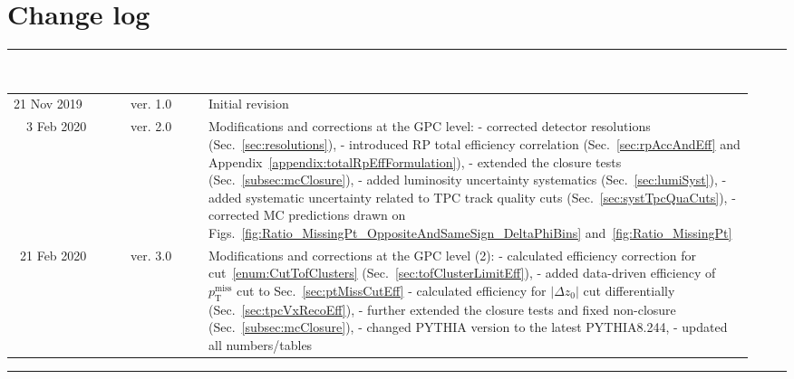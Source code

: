 \section*{\LARGE Change log}%
%
  \rule{\textwidth}{1.0pt}\\[5pt]%
  \begin{tabular}{>{\raggedright}p{0.15\linewidth}p{0.1\linewidth}p{0.7\linewidth}}
  	21 Nov 2019 & ver. 1.0 & Initial revision\\
  	~~3 Feb 2020 & ver. 2.0 & Modifications and corrections at the GPC level:%
  	\newline- corrected detector resolutions (Sec.~\ref{sec:resolutions}),%
  	\newline- introduced RP total efficiency correlation (Sec.~\ref{sec:rpAccAndEff} and Appendix~\ref{appendix:totalRpEffFormulation}),%
  	\newline- extended the closure tests (Sec.~\ref{subsec:mcClosure}),%
  	\newline- added luminosity uncertainty systematics (Sec.~\ref{sec:lumiSyst}),%
  	\newline- added systematic uncertainty related to TPC track quality cuts (Sec.~\ref{sec:systTpcQuaCuts}),%
  	\newline- corrected MC predictions drawn on Figs.~\ref{fig:Ratio_MissingPt_OppositeAndSameSign_DeltaPhiBins} and~\ref{fig:Ratio_MissingPt}\\
  	~21 Feb 2020 & ver. 3.0 & Modifications and corrections at the GPC level (2):%
  	\newline- calculated efficiency correction for cut~\ref{enum:CutTofClusters} (Sec.~\ref{sec:tofClusterLimitEff}),%
  	\newline- added data-driven efficiency of $p_{\text{T}}^{\text{miss}}$ cut to Sec.~\ref{sec:ptMissCutEff}
  	\newline- calculated efficiency for $|\Delta z_{0}|$ cut differentially (Sec.~\ref{sec:tpcVxRecoEff}),%
  	\newline- further extended the closure tests and fixed non-closure (Sec.~\ref{subsec:mcClosure}),%
  	\newline- changed PYTHIA version to the latest PYTHIA8.244,%
  	\newline- updated all numbers/tables
  \end{tabular}\newline%
 \rule{\textwidth}{1.0pt}
